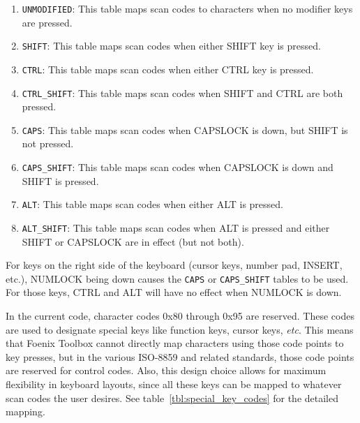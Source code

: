 
\begin{enumerate}
    \item \verb+UNMODIFIED+: This table maps scan codes to characters when no modifier keys are pressed.
    \item \verb+SHIFT+: This table maps scan codes when either SHIFT key is pressed.
    \item \verb+CTRL+: This table maps scan codes when either CTRL key is pressed.
    \item \verb+CTRL_SHIFT+: This table maps scan codes when SHIFT and CTRL are both pressed.
    \item \verb+CAPS+: This table maps scan codes when CAPSLOCK is down, but SHIFT is not pressed.
    \item \verb+CAPS_SHIFT+: This table maps scan codes when CAPSLOCK is down and SHIFT is pressed.
    \item \verb+ALT+: This table maps scan codes when either ALT is pressed.
    \item \verb+ALT_SHIFT+: This table maps scan codes when ALT is pressed and either SHIFT or CAPSLOCK are in effect (but not both).
\end{enumerate}

For keys on the right side of the keyboard (cursor keys, number pad, INSERT, etc.), NUMLOCK being down causes the \verb+CAPS+ or
\verb+CAPS_SHIFT+ tables to be used. For those keys, CTRL and ALT will have no effect when NUMLOCK is down.

In the current code, character codes 0x80 through 0x95 are reserved. These codes are used to designate special keys like function keys,
cursor keys, {\it etc}. This means that Foenix Toolbox cannot directly map characters using those code points to key presses,
but in the various ISO-8859 and related standards, those code points are reserved for control codes.
Also, this design choice allows for maximum flexibility in keyboard layouts, since all these keys can be mapped to whatever scan codes the user desires.
See table~\ref{tbl:special_key_codes} for the detailed mapping.

